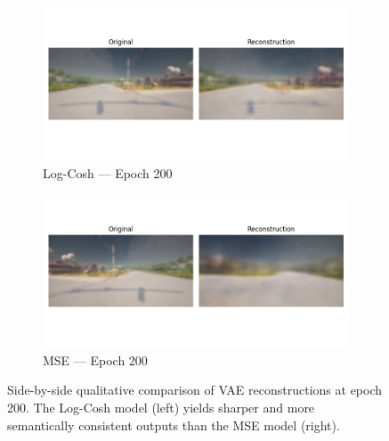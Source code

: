 \begin{figure}[htbp]
    \centering
    \begin{subfigure}[b]{0.45\textwidth}
        \includegraphics[width=\textwidth]{img/vae_results/200_epochs_128_ls_logcosh/reconstructions/epoch_200.png}
        \caption{Log-Cosh — Epoch 200}
        \label{fig:logcosh_epoch200}
    \end{subfigure}
    \hfill
    \begin{subfigure}[b]{0.45\textwidth}
        \includegraphics[width=\textwidth]{img/vae_results/200_epochs_128_ls_mse/reconstructions/epoch_200.png}
        \caption{MSE — Epoch 200}
        \label{fig:mse_epoch200}
    \end{subfigure}
    \caption[Qualitative comparison of VAE reconstructions (Log-Cosh vs. MSE)]{%
Side-by-side qualitative comparison of VAE reconstructions at epoch 200. The Log-Cosh model (left) yields sharper and more semantically consistent outputs than the MSE model (right).}
    \label{fig:vae_qualitative_comparison}
\end{figure}







\clearpage


